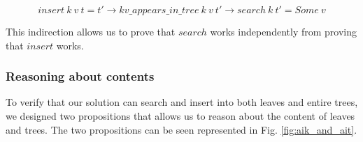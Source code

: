 \begin{equation}
  insert~k~v~t = t' \rightarrow kv\_appears\_in\_tree~k~v~t' \rightarrow search~k~t' = Some~v
  \label{intermediate_model}
\end{equation}

This indirection allows us to prove that $search$ works independently from proving that $insert$ works.

\subsubsection{Reasoning about contents}
To verify that our solution can search and insert into both leaves and entire trees, we designed two propositions that allows us to reason about the content of leaves and trees. The two propositions can be seen represented in Fig. \ref{fig:aik_and_ait}. 

